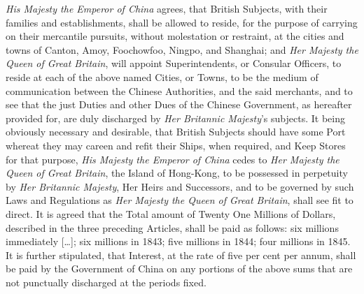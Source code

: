 \begin{fancyquote}
	\vspace*{0.5em}
	\vspace*{0.5em}
	\textit{His Majesty the Emperor of China} agrees, that British Subjects, with their families and establishments, shall be allowed to reside, for the purpose of carrying on their mercantile pursuits, without molestation or restraint, at the cities and towns of Canton, Amoy, Foochowfoo, Ningpo, and Shanghai; and \textit{Her Majesty the Queen of Great Britain}, will appoint Superintendents, or Consular Officers, to reside at each of the above named Cities, or Towns, to be the medium of communication between the Chinese Authorities, and the said merchants, and to see that the just Duties and other Dues of the Chinese Government, as hereafter provided for, are duly discharged by \textit{Her Britannic Majesty}'s subjects.
	It being obviously necessary and desirable, that British Subjects should have some Port whereat they may careen and refit their Ships, when required, and Keep Stores for that purpose, \textit{His Majesty the Emperor of China} cedes to \textit{Her Majesty the Queen of Great Britain}, the Island of Hong-Kong, to be possessed in perpetuity by \textit{Her Britannic Majesty}, Her Heirs and Successors, and to be governed by such Laws and Regulations as \textit{Her Majesty the Queen of Great Britain}, shall see fit to direct.
	It is agreed that the Total amount of Twenty One Millions of Dollars, described in the three preceding Articles, shall be paid as follows: six millions immediately [\ldots]; six millions in 1843; five millions in 1844; four millions in 1845. It is further stipulated, that Interest, at the rate of five per cent per annum, shall be paid by the Government of China on any portions of the above sums that are not punctually discharged at the periods fixed.
	\begin{flushright}
		\autocite{Mayers:1902}
	\end{flushright}
\end{fancyquote}
